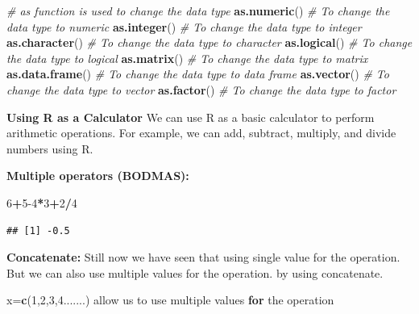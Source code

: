 \documentclass[
]{article}
\newenvironment{Shaded}{\begin{snugshade}}{\end{snugshade}}
\newcommand{\CommentTok}[1]{\textcolor[rgb]{0.56,0.35,0.01}{\textit{#1}}}
\newcommand{\ControlFlowTok}[1]{\textcolor[rgb]{0.13,0.29,0.53}{\textbf{#1}}}
\newcommand{\DecValTok}[1]{\textcolor[rgb]{0.00,0.00,0.81}{#1}}
\newcommand{\FunctionTok}[1]{\textcolor[rgb]{0.13,0.29,0.53}{\textbf{#1}}}
\newcommand{\NormalTok}[1]{#1}
\newcommand{\OtherTok}[1]{\textcolor[rgb]{0.56,0.35,0.01}{#1}}
\newcommand{\SpecialCharTok}[1]{\textcolor[rgb]{0.81,0.36,0.00}{\textbf{#1}}}
\begin{document}
\begin{Shaded}
\begin{Highlighting}[]
\CommentTok{\# as function is used to change the data type}
\FunctionTok{as.numeric}\NormalTok{() }\CommentTok{\# To change the data type to numeric}
\FunctionTok{as.integer}\NormalTok{() }\CommentTok{\# To change the data type to integer}
\FunctionTok{as.character}\NormalTok{() }\CommentTok{\# To change the data type to character}
\FunctionTok{as.logical}\NormalTok{() }\CommentTok{\# To change the data type to logical}
\FunctionTok{as.matrix}\NormalTok{() }\CommentTok{\# To change the data type to matrix}
\FunctionTok{as.data.frame}\NormalTok{() }\CommentTok{\# To change the data type to data frame}
\FunctionTok{as.vector}\NormalTok{() }\CommentTok{\# To change the data type to vector}
\FunctionTok{as.factor}\NormalTok{() }\CommentTok{\# To change the data type to factor}
\end{Highlighting}
\end{Shaded}

\textbf{Using R as a Calculator} We can use R as a basic calculator to
perform arithmetic operations. For example, we can add, subtract,
multiply, and divide numbers using R.

\textbf{Multiple operators (BODMAS):}

\begin{Shaded}
\begin{Highlighting}[]
 \DecValTok{6}\SpecialCharTok{+}\DecValTok{5{-}4}\SpecialCharTok{*}\DecValTok{3}\SpecialCharTok{+}\DecValTok{2}\SpecialCharTok{/}\DecValTok{4}
\end{Highlighting}
\end{Shaded}

\begin{verbatim}
## [1] -0.5
\end{verbatim}

\textbf{Concatenate:} Still now we have seen that using single value for
the operation. But we can also use multiple values for the operation. by
using concatenate.

\begin{Shaded}
\begin{Highlighting}[]
\NormalTok{x}\OtherTok{=}\FunctionTok{c}\NormalTok{(}\DecValTok{1}\NormalTok{,}\DecValTok{2}\NormalTok{,}\DecValTok{3}\NormalTok{,}\DecValTok{4}\NormalTok{.......)}
\NormalTok{allow us to use multiple values }\ControlFlowTok{for}\NormalTok{ the operation}
\end{Highlighting}
\end{Shaded}
\end{document}
